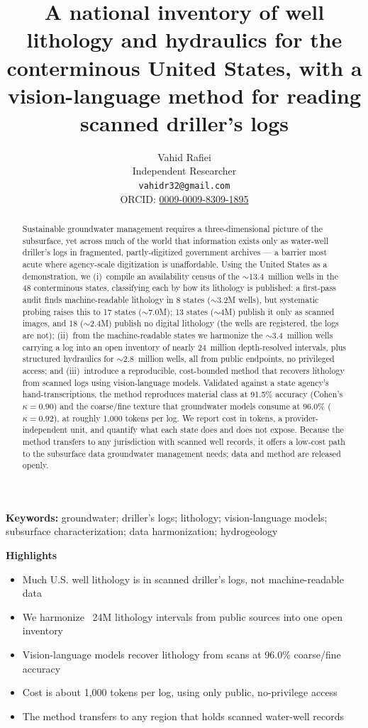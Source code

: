 \documentclass[12pt]{article}
\title{A national inventory of well lithology and hydraulics for the conterminous United States,
with a vision-language method for reading scanned driller's logs}
\author{%
  Vahid Rafiei\\
  Independent Researcher\\
  \texttt{vahidr32@gmail.com}\\
  ORCID: \href{https://orcid.org/0009-0009-8309-1895}{0009-0009-8309-1895}
}
\date{}
\begin{document}
\maketitle

\begin{abstract}
\noindent
Sustainable groundwater management requires a three-dimensional picture of the subsurface, yet across
much of the world that information exists only as water-well driller's logs in fragmented,
partly-digitized government archives --- a barrier most acute where agency-scale digitization is
unaffordable. Using the United States as a
demonstration, we (i)~compile an availability census of the $\sim$13.4~million wells in the 48
conterminous states, classifying each by how its lithology is published: a first-pass audit finds
machine-readable lithology in 8 states ($\sim$3.2M wells), but systematic probing raises this to 17 states
($\sim$7.0M); 13 states ($\sim$4M) publish it only as scanned images, and 18 ($\sim$2.4M) publish no digital
lithology (the wells are registered, the logs are not); (ii)~from the machine-readable states we harmonize
the $\sim$3.4~million wells carrying a log into an open inventory of nearly 24~million depth-resolved
intervals, plus structured hydraulics for $\sim$2.8~million wells, all from public endpoints, no
privileged access; and (iii)~introduce a reproducible, cost-bounded method that recovers lithology from scanned logs
using vision-language models. Validated against a state agency's hand-transcriptions, the method
reproduces material class at 91.5\% accuracy (Cohen's $\kappa=0.90$) and the coarse/fine texture that
groundwater models consume at 96.0\% ($\kappa=0.92$), at roughly 1{,}000 tokens per log. We report cost in
tokens, a provider-independent unit, and quantify what each state does and does not expose. Because the
method transfers to any jurisdiction with scanned well records, it offers a low-cost path to the subsurface
data groundwater management needs; data and method are released openly.
\end{abstract}

\medskip\noindent\textbf{Keywords:} groundwater; driller's logs; lithology; vision-language models;
subsurface characterization; data harmonization; hydrogeology

\medskip\noindent\textbf{Highlights}
\begin{itemize}\setlength{\itemsep}{0pt}
\item Much U.S. well lithology is in scanned driller's logs, not machine-readable data
\item We harmonize ~24M lithology intervals from public sources into one open inventory
\item Vision-language models recover lithology from scans at 96.0\% coarse/fine accuracy
\item Cost is about 1,000 tokens per log, using only public, no-privilege access
\item The method transfers to any region that holds scanned water-well records
\end{itemize}
\end{document}
